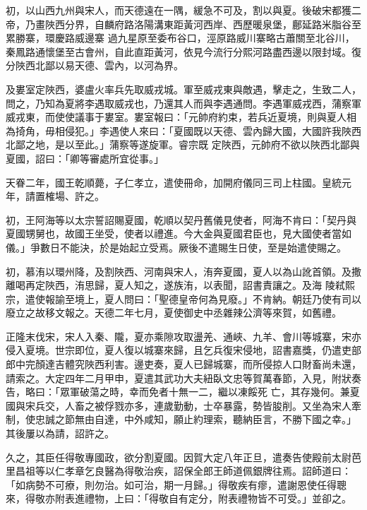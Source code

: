 \begin{pinyinscope}
 初，以山西九州與宋人，而天德遠在一隅，緩急不可及，割以與夏。後破宋都獲二帝，乃畫陜西分界，自麟府路洛陽溝東距黃河西岸、西歷暖泉堡，鄜延路米脂谷至累勝寨，環慶路威邊寨
 過九星原至委布谷口，涇原路威川寨略古蕭關至北谷川，秦鳳路通懷堡至古會州，自此直距黃河，依見今流行分熙河路盡西邊以限封域。復分陜西北鄙以易天德、雲內，以河為界。



 及婁室定陜西，婆盧火率兵先取威戎城。軍至威戎東與敵遇，擊走之，生致二人，問之，乃知為夏將李遇取威戎也，乃還其人而與李遇通問。李遇軍威戎西，蒲察軍威戎東，而使使議事于婁室。婁室報曰：「元帥府約束，若兵近夏境，則與夏人相為掎角，毋相侵犯。」李遇使人來曰：「夏國既以天德、雲內歸大國，大國許我陜西北鄙之地，是以至此。」蒲察等遂旋軍。睿宗既
 定陜西，元帥府不欲以陜西北鄙與夏國，詔曰：「卿等審處所宜從事。」



 天眷二年，國王乾順薨，子仁孝立，遣使冊命，加開府儀同三司上柱國。皇統元年，請置榷場、許之。



 初，王阿海等以太宗誓詔賜夏國，乾順以契丹舊儀見使者，阿海不肯曰：「契丹與夏國甥舅也，故國王坐受，使者以禮進。今大金與夏國君臣也，見大國使者當如儀。」爭數日不能決，於是始起立受焉。厥後不遣賜生日使，至是始遣使賜之。



 初，慕洧以環州降，及割陜西、河南與宋人，洧奔夏國，夏人以為山訛首領。及撒離喝再定陜西，洧思歸，夏人知之，遂族洧，以表聞，詔書責讓之。及海
 陵弒熙宗，遣使報諭至境上，夏人問曰：「聖德皇帝何為見廢。」不肯納。朝廷乃使有司以廢立之故移文報之。天德二年七月，夏使御史中丞雜辣公濟等來賀，如舊禮。



 正隆末伐宋，宋人入秦、隴，夏亦乘隙攻取盪羌、通峽、九羊、會川等城寨，宋亦侵入夏境。世宗即位，夏人復以城寨來歸，且乞兵復宋侵地，詔書嘉獎，仍遣吏部郎中完顏達吉體究陜西利害。邊吏奏，夏人已歸城寨，而所侵掠人口財畜尚未還，請索之。大定四年二月甲申，夏遣其武功大夫紐臥文忠等賀萬春節，入見，附狀奏告，略曰：「眾軍破蕩之時，幸而免者十無一二，繼以凍餒死
 亡，其存幾何。兼夏國與宋兵交，人畜之被俘戮亦多，連歲勤動，士卒暴露，勢皆朘削。又坐為宋人牽制，使忠誠之節無由自達，中外咸知，願止約理索，聽納臣言，不勝下國之幸。」其後屢以為請，詔許之。



 久之，其臣任得敬專國政，欲分割夏國。因賀大定八年正旦，遣奏告使殿前太尉芭里昌祖等以仁孝章乞良醫為得敬治疾，詔保全郎王師道佩銀牌往焉。詔師道曰：「如病勢不可療，則勿治。如可治，期一月歸。」得敬疾有瘳，遣謝恩使任得聰來，得敬亦附表進禮物，上曰：「得敬自有定分，附表禮物皆不可受。」並卻之。




\end{pinyinscope}
